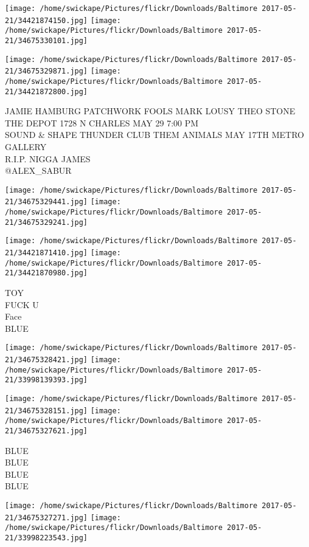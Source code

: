 \documentclass[10pt,letterpaper]{article}
\begin{document}
\texttt{[image: /home/swickape/Pictures/flickr/Downloads/Baltimore 2017-05-21/34421874150.jpg]}
\texttt{[image: /home/swickape/Pictures/flickr/Downloads/Baltimore 2017-05-21/34675330101.jpg]}

\texttt{[image: /home/swickape/Pictures/flickr/Downloads/Baltimore 2017-05-21/34675329871.jpg]}
\texttt{[image: /home/swickape/Pictures/flickr/Downloads/Baltimore 2017-05-21/34421872800.jpg]}

JAMIE HAMBURG PATCHWORK FOOLS MARK LOUSY THEO STONE THE DEPOT 1728 N CHARLES MAY 29 7:00 PM\\
SOUND \& SHAPE THUNDER CLUB THEM ANIMALS MAY 17TH METRO GALLERY\\
R.I.P. NIGGA JAMES\\
@ALEX\_SABUR\\
\pagebreak

\texttt{[image: /home/swickape/Pictures/flickr/Downloads/Baltimore 2017-05-21/34675329441.jpg]}
\texttt{[image: /home/swickape/Pictures/flickr/Downloads/Baltimore 2017-05-21/34675329241.jpg]}

\texttt{[image: /home/swickape/Pictures/flickr/Downloads/Baltimore 2017-05-21/34421871410.jpg]}
\texttt{[image: /home/swickape/Pictures/flickr/Downloads/Baltimore 2017-05-21/34421870980.jpg]}

TOY\\
FUCK U\\
Face\\
BLUE\\
\pagebreak

\texttt{[image: /home/swickape/Pictures/flickr/Downloads/Baltimore 2017-05-21/34675328421.jpg]}
\texttt{[image: /home/swickape/Pictures/flickr/Downloads/Baltimore 2017-05-21/33998139393.jpg]}

\texttt{[image: /home/swickape/Pictures/flickr/Downloads/Baltimore 2017-05-21/34675328151.jpg]}
\texttt{[image: /home/swickape/Pictures/flickr/Downloads/Baltimore 2017-05-21/34675327621.jpg]}

BLUE\\
BLUE\\
BLUE\\
BLUE\\
\pagebreak

\texttt{[image: /home/swickape/Pictures/flickr/Downloads/Baltimore 2017-05-21/34675327271.jpg]}
\texttt{[image: /home/swickape/Pictures/flickr/Downloads/Baltimore 2017-05-21/33998223543.jpg]}
\end{document}
